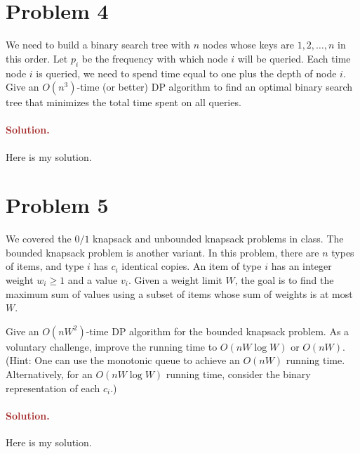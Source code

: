 \section*{Problem 4}
We need to build a binary search tree with $n$ nodes whose keys are $1, 2, \ldots, n$ in this order. Let $p_i$ be the frequency with which node $i$ will be queried. Each time node $i$ is queried, we need to spend time equal to one plus the depth of node $i$. Give an $O(n^3)$-time (or better) DP algorithm to find an optimal binary search tree that minimizes the total time spent on all queries.

\paragraph{\textcolor{brown}{Solution.}}
Here is my solution.


\section*{Problem 5}
We covered the $0/1$ knapsack and unbounded knapsack problems in class. The bounded knapsack problem is another variant. In this problem, there are $n$ types of items, and type $i$ has $c_i$ identical copies. An item of type $i$ has an integer weight $w_i \geq 1$ and a value $v_i$. Given a weight limit $W$, the goal is to find the maximum sum of values using a subset of items whose sum of weights is at most $W$.

Give an $O(nW^2)$-time DP algorithm for the bounded knapsack problem. As a voluntary challenge, improve the running time to $O(nW\log W)$ or $O(nW)$. (Hint: One can use the monotonic queue to achieve an $O(nW)$ running time. Alternatively, for an $O(nW \log W)$ running time, consider the binary representation of each $c_i$.)


\paragraph{\textcolor{brown}{Solution.}}
Here is my solution.

